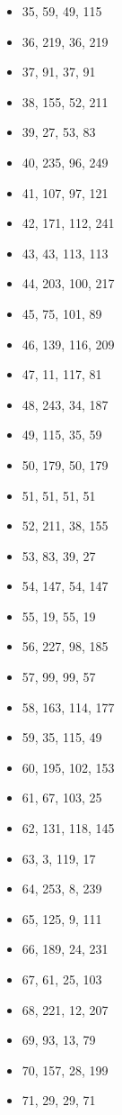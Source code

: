 \documentclass[12pt, fleqn]{report}                             %
\theoremstyle{break}                                            %
\begin{document}
\begin{multicols}{3}
\begin{itemize}
        \item 35, 59, 49, 115
        \item 36, 219, 36, 219
        \item 37, 91, 37, 91
        \item 38, 155, 52, 211
        \item 39, 27, 53, 83
        \item 40, 235, 96, 249
        \item 41, 107, 97, 121
        \item 42, 171, 112, 241
        \item 43, 43, 113, 113
        \item 44, 203, 100, 217
        \item 45, 75, 101, 89
        \item 46, 139, 116, 209
        \item 47, 11, 117, 81
        \item 48, 243, 34, 187
        \item 49, 115, 35, 59
        \item 50, 179, 50, 179
        \item 51, 51, 51, 51
        \item 52, 211, 38, 155
        \item 53, 83, 39, 27
        \item 54, 147, 54, 147
        \item 55, 19, 55, 19
        \item 56, 227, 98, 185
        \item 57, 99, 99, 57
        \item 58, 163, 114, 177
        \item 59, 35, 115, 49
        \item 60, 195, 102, 153
        \item 61, 67, 103, 25
        \item 62, 131, 118, 145
        \item 63, 3, 119, 17
        \item 64, 253, 8, 239
        \item 65, 125, 9, 111
        \item 66, 189, 24, 231
        \item 67, 61, 25, 103
        \item 68, 221, 12, 207
        \item 69, 93, 13, 79
        \item 70, 157, 28, 199
        \item 71, 29, 29, 71

\end{itemize}
\end{multicols}
\end{document}

